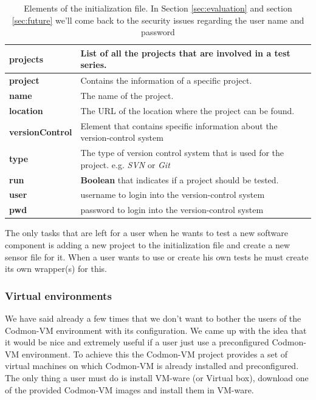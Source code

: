 \documentclass{article}
\newcommand{\project}{Codmon-VM}
\begin{document}
\begin{table}[ht]
\centering
  \begin{tabular}{ | l| p{5cm} |}
  \hline
  \textbf{projects} & List of all the projects that are involved in a test series. \\ \hline
  \textbf{project} & Contains the information of a specific project. \\ \hline
  \textbf{name} & The name of the project. \\ \hline
  \textbf{location} & The URL of the location where the project can be found. \\ \hline
  \textbf{versionControl} & Element that contains specific information about the version-control system \\ \hline
  \textbf{type} & The type of version control system that is used for the project. e.g. \emph{SVN} or \emph{Git} \\ \hline
  \textbf{run} & \textbf{Boolean} that indicates if a project should be tested. \\ \hline
  \textbf{user} & username to login into the version-control system \\ \hline
  \textbf{pwd} & password to login into the version-control system \\ \hline
  \end{tabular}
\caption{Elements of the initialization file. In Section \ref{sec:evaluation} and section \ref{sec:future} we'll come back to the security issues regarding the user name and password}
\label{tab:init}
\end{table}


\noindent The only tasks that are left for a user  when he wants to test a new software component is adding a new project to the initialization file and create a new sensor file for it. When a user wants 
to use or create his own tests he must create its own wrapper(s) for this. 

\subsubsection{Virtual environments}
\label{imp:virual}
We have said already a few times that we don't want to bother the users of the \project{} environment with its configuration. We came up with the idea that it would be nice and extremely useful if a 
user just use a preconfigured \project{} environment. To achieve this the \project{} project provides a set of virtual machines on which \project{} is already installed and preconfigured. The only thing a 
user must do is install VM-ware (or Virtual box), download one of the provided \project{} images and install them in VM-ware.\\
\end{document}

